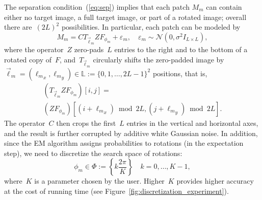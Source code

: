 \documentclass{article}
\begin{document}
The separation condition~(\ref{eq:sep}) implies that each patch $M_m$ can contain either no target image, a full  target image, or part of a rotated image; overall there are~$(2L)^2$  possibilities. In particular, each patch can be modeled by
\begin{equation}
\label{eq:patch}
M_m = C T_{\vec{\ell}_m} Z F_{\phi_m} + \varepsilon_m, \quad \varepsilon_m \sim \mathcal{N}(0, \sigma^2 I_{L \times L}),
\end{equation}
where the operator~$Z$ \mbox{zero-pads}~$L$ entries to the right and to the bottom of a rotated copy of~$F$, and~$T_{\vec{\ell}_m}$ circularly shifts the \mbox{zero-padded} image by~\mbox{$\vec{\ell}_m = ({\ell_m}_x, {\ell_m}_y)\in \mathbb{L} := \{0, 1, \ldots, 2L-1\}^2$} positions, that is,
\begin{multline}
(T_{\vec{\ell}_m} Z F_{\phi_m} )\left[i, j\right] = \\(Z F_{\phi_m}) \left[(i + {\ell_m}_x) \bmod 2L, (j + {\ell_m}_y) \bmod  2L\right].
\end{multline}
The operator~$C$ then crops the first~$L$ entries in the vertical and horizontal axes, and the result is further corrupted by additive white Gaussian noise. In addition, since the EM algorithm assigns probabilities to rotations (in the expectation step), we need to discretize the search space of rotations:
\begin{equation}
\label{eq:Phi_set}
\phi_m \in \Phi := \left\{k \frac{2\pi}{K}\right\} \quad k=0,\ldots,K-1,
\end{equation}
where~$K$ is a parameter chosen by the user. Higher~$K$ provides higher accuracy at the cost of running time (see Figure~\ref{fig:discretization_experiment}).
\end{document}
